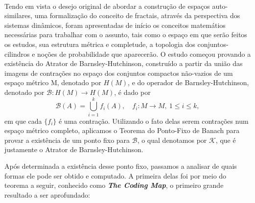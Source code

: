 \documentclass[12pt]{article}
\theoremstyle{definition}
\begin{document}
\paragraph{}Tendo em vista o desejo original de abordar a construção de espaços auto-similares, uma formalização do conceito de fractais,
através da perspectiva dos sistemas dinâmicos, foram apresentadas de início os conceitos matemátios necessárias para trabalhar com o assunto,
tais como o espaço em que serão feitos os estudos, sua estrutura métrica e completude, a topologia dos conjuntos-cilindros e noções de probabilidade que aparecerão.
O estudo começou provando a existência do Atrator de Barnsley-Hutchinson, construído a partir da união das imagens de contrações no espaço dos conjuntos compactos não-vazios de um espaço métrico M, denotado por \(H(M)\), e do operador de Barnsley-Hutchinson, denotado por \(\mathcal{B}:H(M)\rightarrow H(M)\), é dado por
\[
	\mathcal{B}(A)=\bigcup_{i=1}^{k}f_{i}(A), \quad f_{i}:M\rightarrow M,\: 1\leq i\leq k,
\]
em que cada \(\{f_{i}\}\) é uma contração. Utilizando o fato delas serem contrações num espaço métrico completo, aplicamos o Teorema do Ponto-Fixo de Banach para provar a existência
de um ponto fixo para \(\mathcal{B}\), o qual denotamos por \(\mathcal{K}\), que é justamente o Atrator de Barnsley-Hutchinson.

Após determinada a existência desse ponto fixo, passamos a analisar de quais formas ele pode ser obtido e computado. A primeira delas foi por meio do teorema a seguir, conhecido como \textit{\textbf{The Coding Map}}, o primeiro
grande resultado a ser aprofundado:
\end{document}
